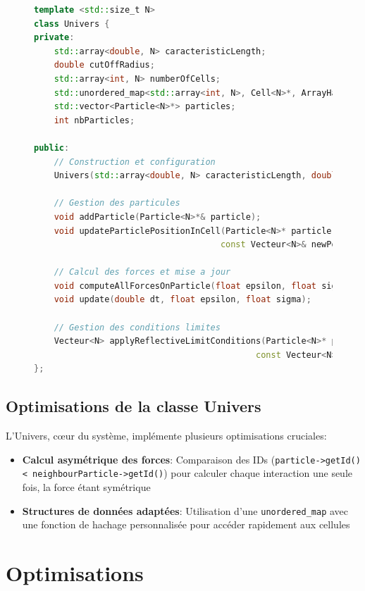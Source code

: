\documentclass[12pt,a4paper]{article}
\begin{document}
\begin{figure}[H]
\begin{lstlisting}[language=C++, caption=Extrait de la classe Univers]
template <std::size_t N>
class Univers {
private:
    std::array<double, N> caracteristicLength;
    double cutOffRadius;
    std::array<int, N> numberOfCells;
    std::unordered_map<std::array<int, N>, Cell<N>*, ArrayHash<N>> cells;
    std::vector<Particle<N>*> particles;
    int nbParticles;

public:
    // Construction et configuration
    Univers(std::array<double, N> caracteristicLength, double cutOffRadius);
    
    // Gestion des particules
    void addParticle(Particle<N>*& particle);
    void updateParticlePositionInCell(Particle<N>* particle, 
                                     const Vecteur<N>& newPosition);
    
    // Calcul des forces et mise a jour
    void computeAllForcesOnParticle(float epsilon, float sigma);
    void update(double dt, float epsilon, float sigma);
    
    // Gestion des conditions limites
    Vecteur<N> applyReflectiveLimitConditions(Particle<N>* particle, 
                                            const Vecteur<N>& newPosition);
};
\end{lstlisting}
\end{figure}

\subsection{Optimisations de la classe Univers}

L'Univers, cœur du système, implémente plusieurs optimisations cruciales:

\begin{itemize}
    \item \textbf{Calcul asymétrique des forces}: Comparaison des IDs (\texttt{particle->getId() < neighbourParticle->getId()}) pour calculer chaque interaction une seule fois, la force étant symétrique
    \item \textbf{Structures de données adaptées}: Utilisation d'une \texttt{unordered\_map} avec une fonction de hachage personnalisée pour accéder rapidement aux cellules
\end{itemize}

\section{Optimisations}
\end{document}

